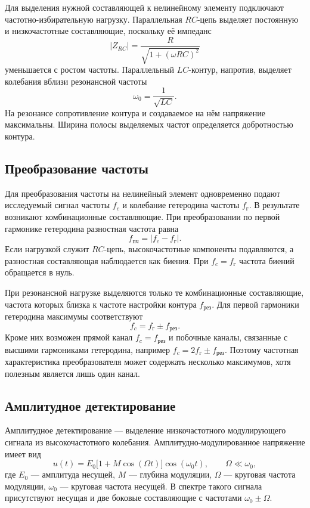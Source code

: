Для выделения нужной составляющей к нелинейному элементу подключают частотно-избирательную нагрузку. Параллельная $RC$-цепь выделяет постоянную и низкочастотные составляющие, поскольку её импеданс
\[
|Z_{RC}|=\frac{R}{\sqrt{1+(\omega RC)^2}}
\]
уменьшается с ростом частоты. Параллельный $LC$-контур, напротив, выделяет колебания вблизи резонансной частоты
\[
\omega_0=\frac{1}{\sqrt{LC}}.
\]
На резонансе сопротивление контура и создаваемое на нём напряжение максимальны. Ширина полосы выделяемых частот определяется добротностью контура.

\subsection{Преобразование частоты}

Для преобразования частоты на нелинейный элемент одновременно подают исследуемый сигнал частоты $f_c$ и колебание гетеродина частоты $f_{\text{г}}$. В результате возникают комбинационные составляющие. При преобразовании по первой гармонике гетеродина разностная частота равна
\[
f_{\text{пч}}=|f_c-f_{\text{г}}|.
\]
Если нагрузкой служит $RC$-цепь, высокочастотные компоненты подавляются, а разностная составляющая наблюдается как биения. При $f_c=f_{\text{г}}$ частота биений обращается в нуль.

При резонансной нагрузке выделяются только те комбинационные составляющие, частота которых близка к частоте настройки контура $f_{\text{рез}}$. Для первой гармоники гетеродина максимумы соответствуют
\[
f_c=f_{\text{г}}\pm f_{\text{рез}}.
\]
Кроме них возможен прямой канал $f_c=f_{\text{рез}}$ и побочные каналы, связанные с высшими гармониками гетеродина, например $f_c=2f_{\text{г}}\pm f_{\text{рез}}$. Поэтому частотная характеристика преобразователя может содержать несколько максимумов, хотя полезным является лишь один канал.

\subsection{Амплитудное детектирование}

Амплитудное детектирование --- выделение низкочастотного модулирующего сигнала из высокочастотного колебания. Амплитудно-модулированное напряжение имеет вид
\[
u(t)=E_0\bigl[1+M\cos(\Omega t)\bigr]\cos(\omega_0t),
\qquad \Omega\ll\omega_0,
\]
где $E_0$ --- амплитуда несущей, $M$ --- глубина модуляции, $\Omega$ --- круговая частота модуляции, $\omega_0$ --- круговая частота несущей. В спектре такого сигнала присутствуют несущая и две боковые составляющие с частотами $\omega_0\pm\Omega$.

